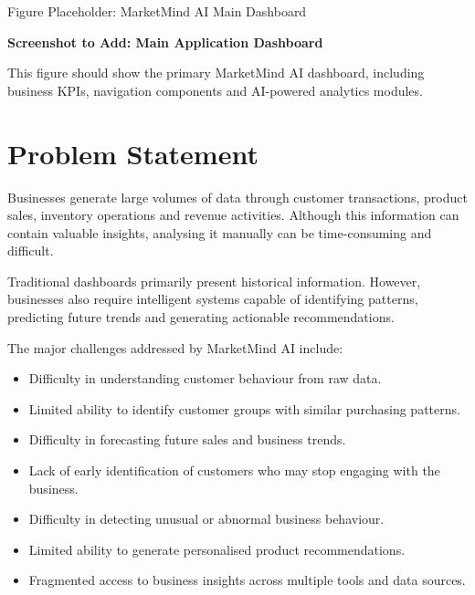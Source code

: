 \documentclass[12pt,a4paper]{report}
\begin{document}
\begin{screenshotplaceholder}{Figure Placeholder: MarketMind AI Main Dashboard}
\centering
\vspace{1cm}

\textbf{Screenshot to Add: Main Application Dashboard}

\vspace{0.3cm}

This figure should show the primary MarketMind AI dashboard,
including business KPIs, navigation components and AI-powered
analytics modules.

\vspace{1cm}
\end{screenshotplaceholder}

\label{fig:main-dashboard}



\section{Problem Statement}

Businesses generate large volumes of data through customer
transactions, product sales, inventory operations and revenue
activities. Although this information can contain valuable insights,
analysing it manually can be time-consuming and difficult.

Traditional dashboards primarily present historical information.
However, businesses also require intelligent systems capable of
identifying patterns, predicting future trends and generating
actionable recommendations.

The major challenges addressed by MarketMind AI include:

\begin{itemize}

    \item Difficulty in understanding customer behaviour from raw data.

    \item Limited ability to identify customer groups with similar
    purchasing patterns.

    \item Difficulty in forecasting future sales and business trends.

    \item Lack of early identification of customers who may stop
    engaging with the business.

    \item Difficulty in detecting unusual or abnormal business
    behaviour.

    \item Limited ability to generate personalised product
    recommendations.

    \item Fragmented access to business insights across multiple
    tools and data sources.

\end{itemize}
\end{document}

